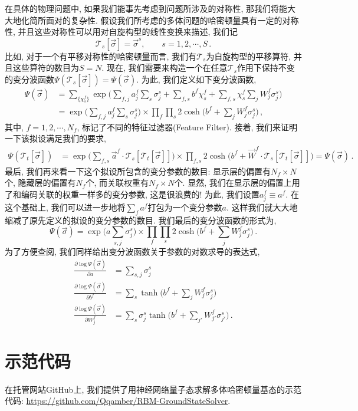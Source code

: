 \documentclass[10pt]{article}
\begin{document}
在具体的物理问题中, 如果我们能事先考虑到问题所涉及的对称性, 那我们将能大大地化简所面对的复杂性. 
假设我们所考虑的多体问题的哈密顿量具有一定的对称性, 并且这些对称性可以用对自旋构型的线性变换来描述, 我们记
\[ \mathcal{T}_{s}[\vec{\sigma}]=\vec{\sigma}^{s}, \qquad{} s=1,2,\cdots,S\,. \]
比如, 对于一个有平移对称性的哈密顿量而言, 我们有$\mathcal{T}_{s}$为自旋构型的平移算符, 并且这些算符的数目为$S=N$. 
现在, 我们需要来构造一个在任意$\mathcal{T}_{s}$作用下保持不变的变分波函数$\Psi(\mathcal{T}_{s}[\vec{\sigma}])=\Psi(\vec{\sigma})$. 
为此, 我们定义如下变分波函数, 
\begin{align}
\Psi(\vec{\sigma}) & = \sum_{\{\chi_{s}^{f}\}} \exp{\Big( \sum_{f,j}a_{j}^{f}\sum_{s}\sigma_{j}^{s} + \sum_{f,s}b^{f}\chi_{s}^{f} 
+ \sum_{f,s}\chi_{s}^{f}\sum_{j}W_{j}^{f}\sigma_{j}^{s} \Big)} \\
& = \exp{\Big(\sum_{f,j}a_{j}^{f}\sum_{s}\sigma_{j}^{s}\Big)} 
\times \prod_{f}\prod_{s}2\cosh\Big(b^{f}+\sum_{j}W_{j}^{f}\sigma_{j}^{s}\Big)\,, 
\end{align}
其中, $f=1,2,\cdots,N_{f}$, 标记了不同的特征过滤器(Feature Filter). 
接着, 我们来证明一下该拟设满足我们的要求,
\begin{align}
\Psi(\mathcal{T}_{t}[\vec{\sigma}]) & = \exp{\Big(\sum_{f,s}\vec{a}^{f}\cdot\mathcal{T}_{s}[\mathcal{T}_{t}[\vec{\sigma}]]\Big)} 
\times \prod_{f,s} 2 \cosh{\Big(b^{f}+\vec{W}^{f}\cdot\mathcal{T}_{s}[\mathcal{T}_{t}[\vec{\sigma}]]\Big)} = \Psi(\vec{\sigma})\,.
\end{align}
最后, 我们再来看一下这个拟设所包含的变分参数的数目: 显示层的偏置有$N_{f}\times N$个, 隐藏层的偏置有$N_{f}$个, 而关联权重有$N_{f}\times N$个. 
显然, 我们在显示层的偏置上用了和编码关联的权重一样多的变分参数, 这是很浪费的! 
为此, 我们设置$a_{j}^{f}\equiv a^{f}$. 
在这个基础上, 我们可以进一步地将$\sum_{f}a^{f}$打包为一个变分参数$a$. 
这样我们就大大地缩减了原先定义的拟设的变分参数的数目. 
我们最后的变分波函数的形式为,
\[ \Psi(\vec{\sigma}) = \exp{\Big(a\sum_{s,j}\sigma_{j}^{s}\Big)} \times \prod_{f}\prod_{s} 
2\cosh{\Big(b^{f}+\sum_{j}W_{j}^{f}\sigma_{j}^{s}\Big)}\,. \]
为了方便查阅, 我们同样给出变分波函数关于参数的对数求导的表达式,
\begin{align}
\frac{\partial\log\Psi(\vec{\sigma})}{\partial a} & = \sum_{s,j}\sigma_{j}^{s} \nonumber \\
\frac{\partial\log\Psi(\vec{\sigma})}{\partial b^{f}} & 
= \sum_{s} \tanh{\Big(b^{f}+\sum_{j}W_{j}^{f}\sigma_{j}^{s}\Big)} \nonumber \\
\frac{\partial\log\Psi(\vec{\sigma})}{\partial W_{j}^{f}} & 
= \sum_{s}\sigma_{j}^{s}\tanh{\Big(b^{f}+\sum_{j'}W_{j'}^{f}\sigma_{j'}^{s}\Big)}\,.
\end{align}


\section{示范代码}

在托管网站GitHub上, 我们提供了用神经网络量子态求解多体哈密顿量基态的示范代码: \url{https://github.com/Qqamber/RBM-GroundStateSolver}.



\end{document}
